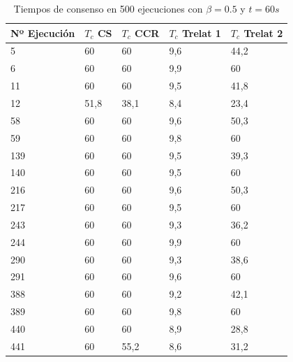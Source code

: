 \begin{table}[!h]
\caption{Tiempos de consenso en 500 ejecuciones con $\beta=0.5$ y $t=60s$}
    \centering
    \begin{tabular}{|l|l|l|l|l|}
    \hline
        \textbf{Nº Ejecución} & \textbf{$T_c$ CS} & \textbf{$T_c$ CCR} & \textbf{$T_c$ Trelat 1} & \textbf{$T_c$ Trelat 2} \\ \hline
        5 & 60 & 60 & \cellcolor{green!15}9,6 & \cellcolor{green!15}44,2 \\ \hline
        6 & 60 & 60 & \cellcolor{green!15}9,9 & 60 \\ \hline \hline
        11 & 60 & 60 & \cellcolor{green!15}9,5 & \cellcolor{green!15}41,8 \\ \hline
        12 & \cellcolor{green!15}51,8 & \cellcolor{green!15}38,1 & \cellcolor{green!15}8,4 & \cellcolor{green!15}23,4 \\ \hline \hline
        58 & 60 & 60 & \cellcolor{green!15}9,6 & \cellcolor{green!15}50,3 \\ \hline
        59 & 60 & 60 & \cellcolor{green!15}9,8 & 60 \\ \hline \hline
        139 & 60 & 60 & \cellcolor{green!15}9,5 & \cellcolor{green!15}39,3 \\ \hline
        140 & 60 & 60 & \cellcolor{green!15}9,5 & 60 \\ \hline \hline
        216 & 60 & 60 & \cellcolor{green!15}9,6 & \cellcolor{green!15}50,3 \\ \hline
        217 & 60 & 60 & \cellcolor{green!15}9,5 & 60 \\ \hline \hline
        243 & 60 & 60 & \cellcolor{green!15}9,3 & \cellcolor{green!15}36,2 \\ \hline
        244 & 60 & 60 & \cellcolor{green!15}9,9 & 60 \\ \hline \hline
        290 & 60 & 60 & \cellcolor{green!15}9,3 & \cellcolor{green!15}38,6 \\ \hline
        291 & 60 & 60 & \cellcolor{green!15}9,6 & 60 \\ \hline \hline
        388 & 60 & 60 & \cellcolor{green!15}9,2 & \cellcolor{green!15}42,1 \\ \hline
        389 & 60 & 60 & \cellcolor{green!15}9,8 & 60 \\ \hline \hline
        440 & 60 & 60 & \cellcolor{green!15}8,9 & \cellcolor{green!15}28,8 \\ \hline
        441 & 60 & \cellcolor{green!15}55,2 & \cellcolor{green!15}8,6 & \cellcolor{green!15}31,2 \\ \hline \hline

\end{tabular}
\end{table}
